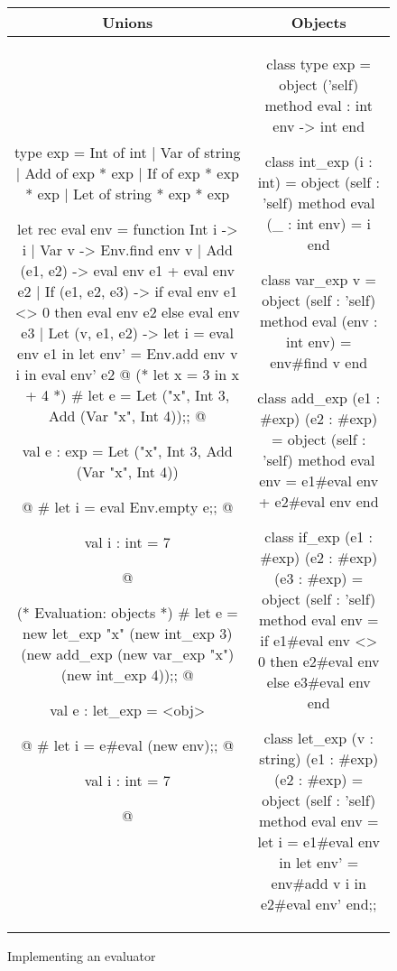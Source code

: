 \begin{figure}
\begin{center}
\begin{tabular}{c|c}
Unions & Objects\\
\hline\hline
\begin{minipage}[t]{2.2in}
\begin{ocamllistingy}
type exp =
   Int of int
 | Var of string
 | Add of exp * exp
 | If  of exp * exp * exp
 | Let of string * exp * exp

let rec eval env = function
   Int i -> i
 | Var v -> Env.find env v
 | Add (e1, e2) ->
    eval env e1 + eval env e2
 | If (e1, e2, e3) ->
    if eval env e1 <> 0
    then eval env e2
    else eval env e3
 | Let (v, e1, e2) ->
    let i = eval env e1 in
    let env' = Env.add env v i in
       eval env' e2
@\hrule@
(* let x = 3 in x + 4 *)
# let e = Let ("x", Int 3,
     Add (Var "x", Int 4));;
@
\begin{topoutput}
val e : exp = Let ("x", Int 3,
   Add (Var "x", Int 4))
\end{topoutput}
@
# let i = eval Env.empty e;;
@
\begin{topoutput}
val i : int = 7
\end{topoutput}
@

(* Evaluation: objects *)
# let e =
    new let_exp "x" (new int_exp 3)
      (new add_exp (new var_exp "x")
        (new int_exp 4));;
@
\begin{topoutput}
val e : let_exp = <obj>
\end{topoutput}
@
# let i = e#eval (new env);;
@
\begin{topoutput}
val i : int = 7
\end{topoutput}
@
\end{ocamllistingy}
\end{minipage}
&
\begin{minipage}[t]{2.2in}
\begin{ocamllistingy}
class type exp =
  object ('self)
    method eval : int env -> int
  end

class int_exp (i : int) =
  object (self : 'self)
    method eval (_ : int env) = i
  end

class var_exp v =
  object (self : 'self)
    method eval (env : int env) =
      env#find v
  end

class add_exp (e1 : #exp) (e2 : #exp) =
  object (self : 'self)
    method eval env =
      e1#eval env + e2#eval env
  end

class if_exp
  (e1 : #exp) (e2 : #exp) (e3 : #exp) =
  object (self : 'self)
    method eval env =
      if e1#eval env <> 0
      then e2#eval env
      else e3#eval env
  end

class let_exp
  (v : string) (e1 : #exp) (e2 : #exp) =
  object (self : 'self)
    method eval env =
      let i = e1#eval env in
      let env' = env#add v i in
        e2#eval env'
  end;;
\end{ocamllistingy}
\end{minipage}
\end{tabular}
\end{center}
\caption{Implementing an evaluator}
\end{figure}

